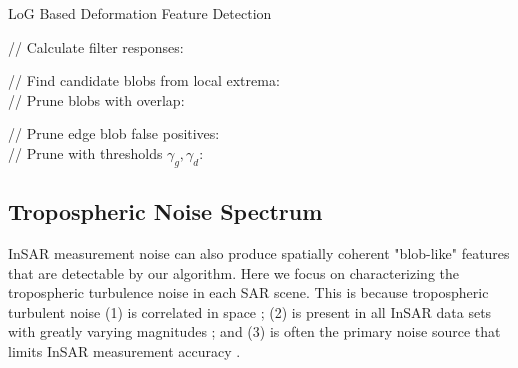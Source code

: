 \begin{algorithm}
	\caption{LoG Based Deformation Feature Detection}\label{algo:blobs}
	\SetAlgoLined
	
	
	// Calculate filter responses:\\
	
	// Find candidate blobs from local extrema:\\
	\For{$ (i, j, m) \in  L $}{
		\If{$L[i, j, m] $ is local extremum }{
				Compute $ r = \sqrt{2}\sigma_m $ \\
				Add $ (i, j, r) $ to list of candidate detections
		}
	}
	// Prune blobs with overlap:\\
	
	// Prune edge blob false positives:\\
	// Prune with thresholds $ \gamma_g, \gamma_d $:\\
\end{algorithm}



\subsection{Tropospheric Noise Spectrum}
\label{subsec:methods-2-tropo-spectrum}
InSAR measurement noise can also produce spatially coherent "blob-like" features that are detectable by our algorithm.  Here we focus on characterizing the tropospheric turbulence noise in each SAR scene. This is because tropospheric turbulent noise (1) is correlated in space \cite{Emardson2003NeutralAtmosphericDelay, Lohman2005SomeThoughtsUse}; (2) is present in all InSAR data sets with greatly varying magnitudes \cite{Barnhart2013CharacterizingEstimatingNoise, Hooper2012RecentAdvancesSar}; and (3) is often the primary noise source that limits InSAR measurement accuracy \cite{Jolivet2014ImprovingInsarGeodesy, Bekaert2015StatisticalComparisonInsar, Parker2015SystematicAssessmentAtmospheric}.

